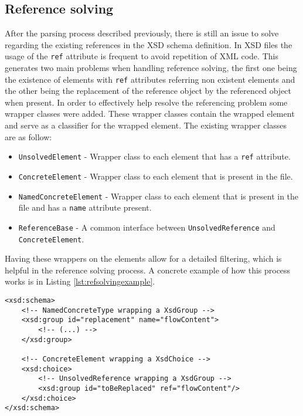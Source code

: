 \newpage

\subsection{Reference solving}
\label{sec:refsolving}

After the parsing process described previously, there is still an issue to solve regarding the existing references in the \ac{XSD} schema definition. In \ac{XSD} files the usage of the \texttt{ref} attribute is frequent to avoid repetition of \ac{XML} code. This generates two main problems when handling reference solving, the first one being the existence of elements with \texttt{ref} attributes referring non existent elements and the other being the replacement of the reference object by the referenced object when present. In order to effectively help resolve the referencing problem some wrapper classes were added. These wrapper classes contain the wrapped element and serve as a classifier for the wrapped element. The existing wrapper classes are as follow:

\begin{itemize}  
	\item \texttt{UnsolvedElement} - Wrapper class to each element that has a \texttt{ref} attribute.
	\item \texttt{ConcreteElement} - Wrapper class to each element that is present in the file.
	\item \texttt{NamedConcreteElement} - Wrapper class to each element that is present in the file and has a \texttt{name} attribute present.
	\item \texttt{ReferenceBase} - A common interface between \texttt{UnsolvedReference} and \texttt{ConcreteElement}.
\end{itemize}

\noindent
Having these wrappers on the elements allow for a detailed filtering, which is helpful in the reference solving process. A concrete example of how this process works is in Listing \ref{lst:refsolvingexample}.

\bigskip


\begin{minipage}{\linewidth}
\begin{lstlisting}[caption={Reference Solving Example},captionpos=b,label={lst:refsolvingexample}]
<xsd:schema>
    <!-- NamedConcreteType wrapping a XsdGroup -->
    <xsd:group id="replacement" name="flowContent">
        <!-- (...) -->
    </xsd:group>
	
    <!-- ConcreteElement wrapping a XsdChoice -->
    <xsd:choice>
        <!-- UnsolvedReference wrapping a XsdGroup -->
        <xsd:group id="toBeReplaced" ref="flowContent"/>
    </xsd:choice>
</xsd:schema>
\end{lstlisting}
\end{minipage}


